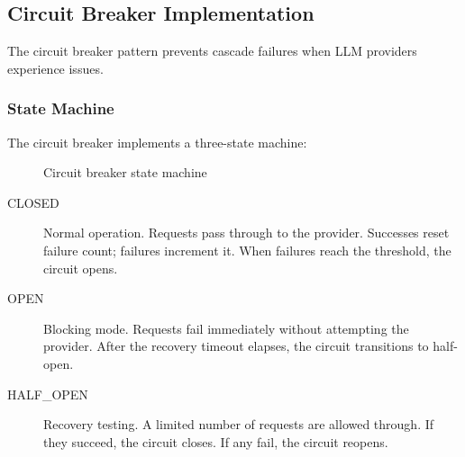 \subsection{Circuit Breaker Implementation}
\label{subsubsec:circuit-breaker}

The circuit breaker pattern prevents cascade failures when LLM providers experience issues.

\subsubsection{State Machine}

The circuit breaker implements a three-state machine:

\begin{figure}[htbp]
\centering
{}
\caption{Circuit breaker state machine}
\label{fig:circuit-breaker}
\end{figure}

\begin{description}
    \item[CLOSED] Normal operation. Requests pass through to the provider. Successes reset failure count; failures increment it. When failures reach the threshold, the circuit opens.
    
    \item[OPEN] Blocking mode. Requests fail immediately without attempting the provider. After the recovery timeout elapses, the circuit transitions to half-open.
    
    \item[HALF\_OPEN] Recovery testing. A limited number of requests are allowed through. If they succeed, the circuit closes. If any fail, the circuit reopens.
\end{description}

